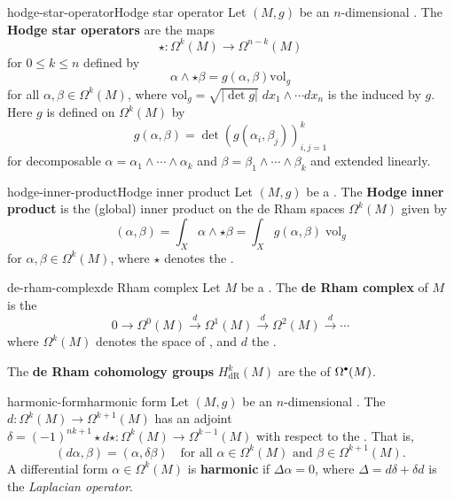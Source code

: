 \begin{topic}{hodge-star-operator}{Hodge star operator}
    Let $(M, g)$ be an $n$-dimensional . The \textbf{Hodge star operators} are the maps
    \[ \star : \Omega^k(M) \to \Omega^{n - k}(M) \]
    for $0 \le k \le n$ defined by
    \[ \alpha \wedge \star \beta = g(\alpha, \beta) \text{vol}_g \]
    for all $\alpha, \beta \in \Omega^k(M)$, where $\text{vol}_g = \sqrt{|\det g|} \; dx_1 \wedge \cdots dx_n$ is the  induced by $g$. Here $g$ is defined on $\Omega^k(M)$ by
    \[ g(\alpha, \beta) = \det\left(g(\alpha_i, \beta_j)\right)_{i, j = 1}^{k} \]
    for decomposable $\alpha = \alpha_1 \wedge \cdots \wedge \alpha_k$ and $\beta = \beta_1 \wedge \cdots \wedge \beta_k$ and extended linearly.
\end{topic}

\begin{topic}{hodge-inner-product}{Hodge inner product}
    Let $(M, g)$ be a . The \textbf{Hodge inner product} is the (global) inner product on the de Rham spaces $\Omega^k(M)$ given by
    \[ (\alpha, \beta) = \int_X \alpha \wedge \star \beta = \int_X g(\alpha, \beta) \; \text{vol}_g \]
    for $\alpha, \beta \in \Omega^k(M)$, where $\star$ denotes the .
\end{topic}

\begin{topic}{de-rham-complex}{de Rham complex}
    Let $M$ be a . The \textbf{de Rham complex} of $M$ is the 
    \[ 0 \to \Omega^0(M) \xrightarrow{d} \Omega^1(M) \xrightarrow{d} \Omega^2(M) \xrightarrow{d} \cdots \]
    where $\Omega^k(M)$ denotes the space of , and $d$ the .
    
    The \textbf{de Rham cohomology groups} $H_\text{dR}^k(M)$ are the  of $\Omega^\bdot(M)$.
\end{topic}

\begin{topic}{harmonic-form}{harmonic form}
    Let $(M, g)$ be an $n$-dimensional . The  $d : \Omega^k(M) \to \Omega^{k + 1}(M)$ has an adjoint $\delta = (-1)^{nk + 1} \star d \star : \Omega^k(M) \to \Omega^{k - 1}(M)$ with respect to the . That is,
    \[ (d \alpha, \beta) = (\alpha, \delta \beta) \quad \text{for all } \alpha \in \Omega^k(M) \text{ and } \beta \in \Omega^{k + 1}(M) . \]
    A differential form $\alpha \in \Omega^k(M)$ is \textbf{harmonic} if $\Delta \alpha = 0$, where $\Delta = d \delta + \delta d$ is the \textit{Laplacian operator}.
\end{topic}

